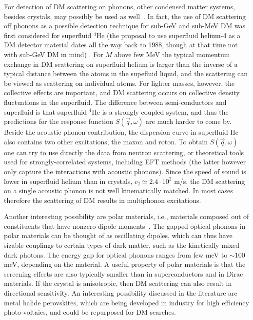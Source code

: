 For detection of DM scattering on phonons, other condensed matter systems, besides crystals, may possibly be used as well~\cite{DM-superfluid-He,DM-polar-materials}. In fact, the use of DM scattering off phonons as a possible detection technique for sub-GeV and sub-MeV DM was first considered for superfluid ${}^4$He (the proposal to use superfluid helium-4 as a DM detector material dates all the way back to 1988, though at that time not with sub-GeV DM in mind) \cite{DM-superfluid-He}. For $M$ above few MeV the typical momentum exchange in DM scattering on superfluid helium is larger than the inverse of a typical distance between the atoms in the supefluid liquid, and the scattering can be viewed as scattering on individual atoms. For lighter masses, however, the collective effects are important, and DM scattering occurs on collective density fluctuations in the superfluid. The difference between semi-conductors and superfluid is that superfluid ${}^4$He is a strongly coupled system, and thus the predictions for the response function $S(\vec q, \omega)$ are much harder to come by. Beside the acoustic phonon contribution, the dispersion curve in superfluid He also contains two other excitations, the maxon and roton. To obtain $S(\vec q, \omega)$ one can try to use directly the data from neutron scattering, or theoretical tools used for strongly-correlated systems, including EFT methods (the latter however only capture the interactions with acoustic phonons). Since the speed of sound  is lower in superfluid helium than in crystals, $c_2\simeq 2.4\cdot 10^2$ m/s, the DM scattering on a single acoustic phonon is not well kinematically matched. In most cases therefore the scattering of DM results in multiphonon excitations.  

Another interesting possibility are polar materials, i.e., materials composed out of constituents that have nonzero dipole moments~\cite{DM-polar-materials}. The gapped optical phonons in polar materials can be thought of as oscillating dipoles, which can thus have sizable couplings to certain types of dark matter, such as the kinetically mixed dark photons. The energy gap for optical phonons ranges from few meV to $\sim100$\,meV, depending on the material. A  useful property of polar materials is that the screening effects are also typically smaller than in superconductors and in Dirac materials. If the crystal is anisotropic, then DM scattering can also result in directional sensitivity. An interesting possibility discussed in the literature are metal halide perovskites, which are being developed in industry for high efficiency photo-voltaics, and could be repurposed for DM searches. 

